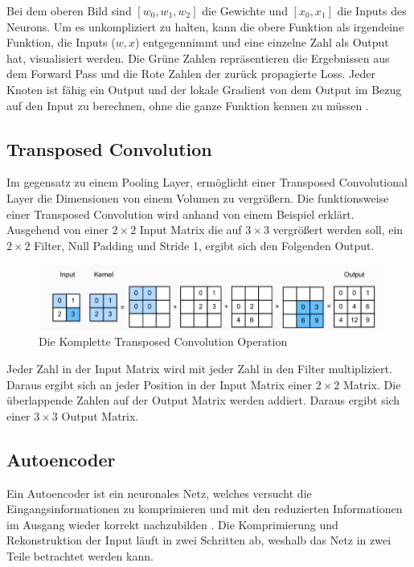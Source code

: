 Bei dem oberen Bild sind $ [w_0, w_1, w_2] $ die Gewichte und $ [x_0, x_1] $ die Inputs des Neurons. Um es unkompliziert zu halten, kann die 
obere Funktion als irgendeine Funktion, die Inputs ($w, x$) entgegennimmt und eine einzelne Zahl als Output hat, visualisiert werden. 
Die Grüne Zahlen repräsentieren die Ergebnissen aus dem Forward Pass und die Rote Zahlen der zurück propagierte Loss. Jeder Knoten ist fähig 
ein Output und der lokale Gradient von dem Output im Bezug auf den Input zu berechnen, ohne die ganze Funktion kennen zu müssen \cite{cs231-backpropagation}.

\subsection{Transposed Convolution}
Im gegensatz zu einem Pooling Layer, ermöglicht einer Transposed Convolutional Layer die Dimensionen von einem Volumen zu vergrößern. 
Die funktionsweise einer Transposed Convolution wird anhand von einem Beispiel erklärt. 
\\
Ausgehend von einer $ 2 \times 2 $ Input Matrix die auf $ 3 \times 3 $ vergrößert werden soll, ein $ 2 \times 2 $ Filter, 
Null Padding und Stride 1, ergibt sich den Folgenden Output. 

\begin{figure}[H]
  \centering
  \includegraphics[width=1\textwidth]{resources/cnn/transposed-conv.png}
  \caption{
    Die Komplette Transposed Convolution Operation
    \cite{zhang2020dive}
  }
  \label{image:transposed-conv}
\end{figure}

Jeder Zahl in der Input Matrix wird mit jeder Zahl in den Filter multipliziert. Daraus ergibt sich an jeder Position in der Input Matrix einer 
$ 2 \times 2 $ Matrix. Die überlappende Zahlen auf der Output Matrix werden addiert. Daraus ergibt sich einer $ 3 \times 3 $ Output Matrix.

\subsection{Autoencoder}
Ein Autoencoder ist ein neuronales Netz, welches versucht die Eingangsinformationen zu komprimieren und mit den reduzierten Informationen 
im Ausgang wieder korrekt nachzubilden \cite{was-ist-autoencoder}. Die Komprimierung und Rekonstruktion der Input läuft in zwei Schritten ab, 
weshalb das Netz in zwei Teile betrachtet werden kann.
\\
